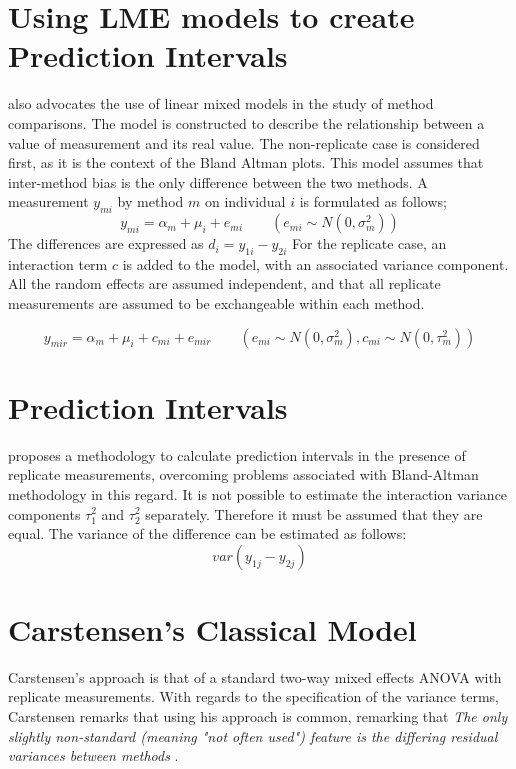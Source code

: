 \documentclass[12pt, a4paper]{report}
\theoremstyle{plain}
\theoremstyle{definition}
\theoremstyle{remark}
\begin{document}
	\section{Using LME models to create Prediction Intervals}
	\citet{BXC2004} also advocates the use of linear mixed models in
	the study of method comparisons. The model is constructed to
	describe the relationship between a value of measurement and its
	real value. The non-replicate case is considered first, as it is
	the context of the Bland Altman plots. This model assumes that
	inter-method bias is the only difference between the two methods.
	A measurement $y_{mi}$ by method $m$ on individual $i$ is
	formulated as follows;
	\begin{equation}
	y_{mi}  = \alpha_{m} + \mu_{i} + e_{mi} \qquad ( e_{mi} \sim
	N(0,\sigma^{2}_{m}))
	\end{equation}
	The differences are expressed as $d_{i} = y_{1i} - y_{2i}$ For the
	replicate case, an interaction term $c$ is added to the model,
	with an associated variance component. All the random effects are
	assumed independent, and that all replicate measurements are
	assumed to be exchangeable within each method.
	
	\begin{equation}
	y_{mir}  = \alpha_{m} + \mu_{i} + c_{mi} + e_{mir} \qquad ( e_{mi}
	\sim N(0,\sigma^{2}_{m}), c_{mi} \sim N(0,\tau^{2}_{m}))
	\end{equation}
	

	\section{Prediction Intervals}



\cite{BXC2008} proposes a methodology to calculate prediction
intervals in the presence of replicate measurements, overcoming
problems associated with Bland-Altman methodology in this regard.
It is not possible to estimate the interaction variance components
$\tau^{2}_{1}$ and $\tau^{2}_{2}$ separately. Therefore it must be
assumed that they are equal. The variance of the difference can be
estimated as follows:
\begin{equation}
var(y_{1j}-y_{2j})
\end{equation}



\section{Carstensen's Classical Model}
Carstensen's approach is that of a standard two-way mixed effects ANOVA with replicate measurements. With regards to the specification of the variance terms, Carstensen remarks that using his approach is common, remarking that \emph{
	The only slightly non-standard (meaning "not often used") feature is the differing residual variances between methods }\citep{BXC2010}.
\end{document}
